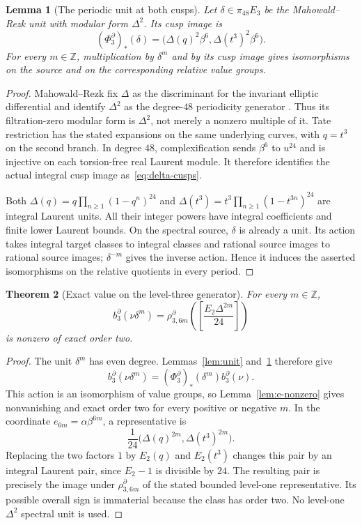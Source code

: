 \documentclass[11pt,a4paper]{amsart}
\newcommand{\Z}{\mathbb Z}
\theoremstyle{plain}
\newtheorem{theorem}{Theorem}[section]
\newtheorem{lemma}[theorem]{Lemma}
\theoremstyle{definition}
\theoremstyle{remark}
\begin{document}
\begin{lemma}[The periodic unit at both cusps]\label{ass:representatives}
Let $\delta\in\pi_{48}E_3$ be the Mahowald--Rezk unit with
modular form $\Delta^2$. Its cusp image is
\begin{equation}\label{eq:delta-cusps}
 (\Phi_3^\partial)_*(\delta)
   =\bigl(\Delta(q)^2\beta^6,\Delta(t^3)^2\beta^6\bigr).
\end{equation}
For every $m\in\Z$, multiplication by $\delta^m$ and by its
cusp image gives isomorphisms on the source and on the corresponding
relative value groups.
\end{lemma}
\begin{proof}
Mahowald--Rezk fix $\Delta$ as the discriminant for the invariant
elliptic differential and identify $\Delta^2$ as the degree-$48$
periodicity generator \cite[Proposition~3.2, Proposition~4.1 and Proposition~5.2]{MR}.
Thus its filtration-zero modular form is $\Delta^2$, not merely
a nonzero multiple of it. Tate restriction has the stated expansions
on the same underlying curves, with $q=t^3$ on the second branch.
In degree $48$, complexification sends $\beta^6$ to $u^{24}$ and
is injective on each torsion-free real Laurent module. It therefore
identifies the actual integral cusp image as~\eqref{eq:delta-cusps}.

Both $\Delta(q)=q\prod_{n\ge1}(1-q^n)^{24}$ and
$\Delta(t^3)=t^3\prod_{n\ge1}(1-t^{3n})^{24}$ are integral
Laurent units. All their integer powers have integral coefficients
and finite lower Laurent bounds. On the spectral source, $\delta$
is already a unit. Its action takes integral target classes to
integral classes and rational source images to rational source
images; $\delta^{-m}$ gives the inverse action. Hence it induces
the asserted isomorphisms on the relative quotients in every period.
\end{proof}

\begin{theorem}[Exact value on the level-three generator]\label{thm:nu-value}
For every $m\in\Z$,
\[
 b_3^\partial(\nu\delta^m)
 =\rho_{3,6m}^\partial\!\left(
 \left[\frac{E_2\Delta^{2m}}{24}\right]\right)
\]
is nonzero of exact order two.
\end{theorem}
\begin{proof}
The unit $\delta^m$ has even degree. Lemmas~\ref{lem:unit}
and~\ref{ass:representatives} therefore give
\[
 b_3^\partial(\nu\delta^m)
   =(\Phi_3^\partial)_*(\delta^m)b_3^\partial(\nu).
\]
This action is an isomorphism of value groups, so
Lemma~\ref{lem:e-nonzero} gives nonvanishing and exact order two
for every positive or negative $m$. In the coordinate
$e_{6m}=\alpha\beta^{6m}$, a representative is
\[
 \frac1{24}\bigl(\Delta(q)^{2m},\Delta(t^3)^{2m}\bigr).
\]
Replacing the two factors $1$ by $E_2(q)$ and $E_2(t^3)$ changes
this pair by an integral Laurent pair, since $E_2-1$ is divisible
by $24$. The resulting pair is precisely the image under
$\rho_{3,6m}^\partial$ of the stated bounded level-one representative.
Its possible overall sign is immaterial because the class has
order two. No level-one $\Delta^2$ spectral unit is used.
\end{proof}
\end{document}
